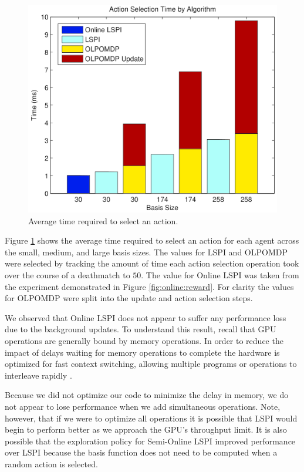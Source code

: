 \begin{figure}
	\centering
		\includegraphics[height=0.33\paperheight]{Action_Selection_Time.png}
	\caption{Average time required to select an action.}
	\label{fig:action:selection}
\end{figure}

Figure \ref{fig:action:selection} shows the average time required to select an action for each agent across the small, medium, and large basis sizes. The values for LSPI and OLPOMDP were selected by tracking the amount of time each action selection operation took over the course of a deathmatch to $50$. The value for Online LSPI was taken from the experiment demonstrated in Figure \ref{fig:online:reward}. For clarity the values for OLPOMDP were split into the update and action selection steps.

We observed that Online LSPI does not appear to suffer any performance loss due to the background updates. To understand this result, recall that GPU operations are generally bound by memory operations. In order to reduce the impact of delays waiting for memory operations to complete the hardware is optimized for fast context switching, allowing multiple programs or operations to interleave rapidly \cite{gpgpu}. 

Because we did not optimize our code to minimize the delay in memory, we do not appear to lose performance when we add simultaneous operations. Note, however, that if we were to optimize all operations it is possible that LSPI would begin to perform better as we approach the GPU's throughput limit. It is also possible that the exploration policy for Semi-Online LSPI improved performance over LSPI because the basis function does not need to be computed when a random action is selected.

